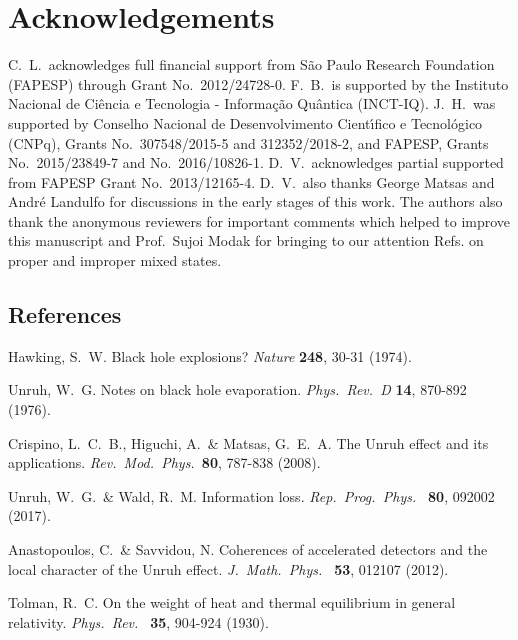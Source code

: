 \documentclass[]{nature}
\begin{document}
{\section*{Acknowledgements} C.\ L.\ acknowledges full financial  support from S\~ao Paulo  Research Foundation (FAPESP) through Grant No.\ 2012/24728-0. F.\ B.\ is 
supported by the Instituto Nacional de Ci\^encia e Tecnologia - Informa\c{c}\~ao Qu\^antica (INCT-IQ).
J.\  H.\  was supported by Conselho Nacional de Desenvolvimento Cient\'\i fico e Tecnol\'ogico (CNPq), Grants No.\
307548/2015-5 and 312352/2018-2, and FAPESP, Grants No.\ 2015/23849-7
and No.\ 2016/10826-1. D.~V.\ acknowledges partial supported from FAPESP Grant No.\ 2013/12165-4. D.~V.\  also thanks George Matsas and
Andr\'e Landulfo for discussions in the early stages of this work. The 
authors also thank the anonymous reviewers
for important comments which helped to improve this manuscript and Prof.\ Sujoi Modak for bringing 
to our attention
Refs.\cite{Espagnat,MOPS} on proper and improper mixed states.



\newpage 

  
  \begin{thebibliography}{}

\section{References}

Hawking, S.\ W. Black hole explosions? {\it Nature} {\bf 248}, 30-31 (1974).


Unruh, W.\ G. Notes on black hole evaporation. {\it Phys.\ Rev.\ D} {\bf 14}, 870-892 (1976).

Crispino, L.\ C.\ B.,  Higuchi, A.\ \&  Matsas, G.\ E.\ A. The Unruh effect and its applications. {\it Rev.\ Mod.\ Phys.\ }{\bf 80}, 787-838 (2008).

Unruh, W.\ G.\ \&  Wald, R.\ M. Information loss. {\it Rep.\ Prog.\ Phys.\ } {\bf 80}, 092002 (2017).

Anastopoulos, C.\  \&  Savvidou, N. Coherences of accelerated detectors and the local character of the Unruh effect.
{\it J.\ Math.\ Phys.\ } {\bf 53}, 012107 (2012).

Tolman, R.\ C. On the weight of heat and thermal equilibrium in general relativity.
{\it Phys.\ Rev.\ } {\bf 35},  904-924 (1930).


\end{thebibliography}}
\end{document}
